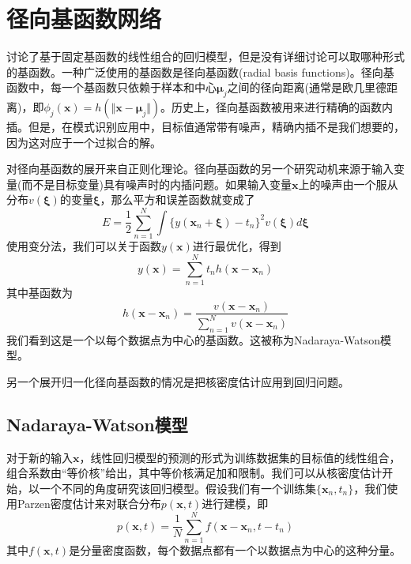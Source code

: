 \section{径向基函数网络}
讨论了基于固定基函数的线性组合的回归模型，但是没有详细讨论可以取哪种形式的基函数。一种广泛使用的基函数是径向基函数(radial basis functions)。径向基函数中，每一个基函数只依赖于样本和中心$\boldsymbol{\mu}_j$之间的径向距离(通常是欧几里德距离)，即$\phi_j(\boldsymbol{x})=h(\Vert \boldsymbol{x}-\boldsymbol{\mu}_j\Vert )$。历史上，径向基函数被用来进行精确的函数内插。但是，在模式识别应用中，目标值通常带有噪声，精确内插不是我们想要的，因为这对应于一个过拟合的解。

对径向基函数的展开来自正则化理论。径向基函数的另一个研究动机来源于输入变量(而不是目标变量)具有噪声时的内插问题。如果输入变量$\boldsymbol{x}$上的噪声由一个服从分布$v(\boldsymbol{\xi})$的变量$\boldsymbol{\xi}$，那么平方和误差函数就变成了
\begin{equation}
	E=\frac{1}{2}\sum_{n=1}^{N}\int \{y(\boldsymbol{x}_n+\boldsymbol{\xi})-t_n \}^2v(\boldsymbol{\xi})d\boldsymbol{\xi}
\end{equation}
使用变分法，我们可以关于函数$y(\boldsymbol{x})$进行最优化，得到 
\begin{equation}
	y(\boldsymbol{x})=\sum_{n=1}^{N}t_nh(\boldsymbol{x}-\boldsymbol{x}_n)
\end{equation}
其中基函数为
\begin{equation}
	h(\boldsymbol{x}-\boldsymbol{x}_n)=\frac{v(\boldsymbol{x}-\boldsymbol{x}_n)}{\sum_{n=1}^{N}v(\boldsymbol{x}-\boldsymbol{x}_n)}
\end{equation}
我们看到这是一个以每个数据点为中心的基函数。这被称为Nadaraya-Watson模型。

另一个展开归一化径向基函数的情况是把核密度估计应用到回归问题。

\subsection*{Nadaraya-Watson模型}
对于新的输入$\boldsymbol{x}$，线性回归模型的预测的形式为训练数据集的目标值的线性组合，组合系数由“等价核”给出，其中等价核满足加和限制。我们可以从核密度估计开始，以一个不同的角度研究该回归模型。假设我们有一个训练集$\{\boldsymbol{x}_n,t_n \}$，我们使用Parzen密度估计来对联合分布$p(\boldsymbol{x},t)$进行建模，即
\begin{equation}
	p(\boldsymbol{x},t)=\frac{1}{N}\sum_{n=1}^{N}f(\boldsymbol{x}-\boldsymbol{x}_n,t-t_n)
\end{equation}
其中$f(\boldsymbol{x},t)$是分量密度函数，每个数据点都有一个以数据点为中心的这种分量。

